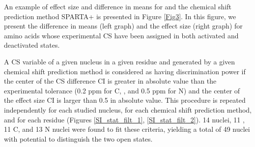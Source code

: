 \documentclass[%
 aip,
 amsmath,amssymb,
 preprint,%
]{revtex4-1}
\newcommand{\ca}{\ce{C_\alpha} }
\newcommand{\cb}{\ce{C_\beta} }
\begin{document}
An example of  effect size and difference in means for \ca and the chemical shift prediction method SPARTA+ is presented in Figure \ref{Fig3}. In this figure, we present the difference in means (left graph) and the effect size (right graph) for  amino acids whose experimental \ca CS have been assigned in both activated and deactivated states. 

A CS variable of a given nucleus in a given residue and generated by a given chemical shift prediction method is considered as having discrimination power if the center of the  CS difference CI is greater in absolute value than the experimental tolerance (0.2 ppm for C, \ca, \cb and 0.5 ppm for N) and the center of the effect size CI is larger than 0.5 in absolute value. This procedure is repeated independently for each studied nucleus, for each chemical shift prediction method, and for each residue (Figures \ref{SI_stat_filt_1}, \ref{SI_stat_filt_2}). 14 \ca nuclei, 11 \cb, 11 C, and 13 N nuclei were found to fit these criteria, yielding a total of 49 nuclei with potential to distinguish the two open states.
\end{document}
